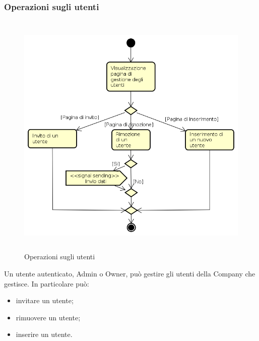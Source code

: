 \subsubsection{Operazioni sugli utenti}
\begin{figure}[H]
\begin{center}
\includegraphics[height=12cm]{res/sections/backend/activities/gestioneUtenti.png}
\caption{Operazioni sugli utenti}
\end{center}
\end{figure}
Un utente autenticato, Admin o Owner, può gestire gli utenti della Company che gestisce. In particolare può:
\begin{itemize}
\item invitare un utente;
\item rimuovere un utente;
\item inserire un utente.
\end{itemize}
